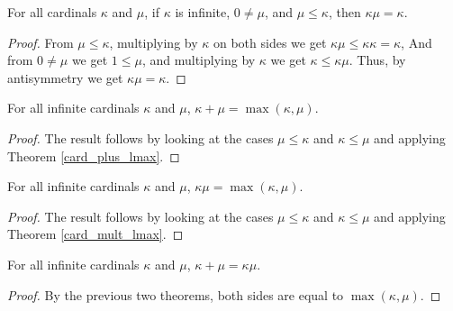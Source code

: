 \documentclass[../../math.tex]{subfiles}
\begin{document}
\begin{theorem} \label{card_mult_lmax}
    For all cardinals $\kappa$ and $\mu$, if $\kappa$ is infinite, $0 \neq \mu$,
    and $\mu \leq \kappa$, then $\kappa \mu = \kappa$.
\end{theorem}
\begin{proof}
    From $\mu \leq \kappa$, multiplying by $\kappa$ on both sides we get $\kappa
    \mu \leq \kappa \kappa = \kappa$,  And from $0 \neq \mu$ we get $1 \leq
    \mu$, and multiplying by $\kappa$ we get $\kappa \leq \kappa \mu$.  Thus, by
    antisymmetry we get $\kappa \mu = \kappa$.
\end{proof}

\begin{theorem} \label{card_plus_max}
    For all infinite cardinals $\kappa$ and $\mu$, $\kappa + \mu = \max(\kappa,
    \mu)$.
\end{theorem}
\begin{proof}
    The result follows by looking at the cases $\mu \leq \kappa$ and $\kappa
    \leq \mu$ and applying Theorem \ref{card_plus_lmax}.
\end{proof}

\begin{theorem} \label{card_mult_max}
    For all infinite cardinals $\kappa$ and $\mu$, $\kappa \mu = \max(\kappa,
    \mu)$.
\end{theorem}
\begin{proof}
    The result follows by looking at the cases $\mu \leq \kappa$ and $\kappa
    \leq \mu$ and applying Theorem \ref{card_mult_lmax}.
\end{proof}

\begin{theorem} \label{card_inf_plus_mult}
    For all infinite cardinals $\kappa$ and $\mu$, $\kappa + \mu = \kappa\mu$.
\end{theorem}
\begin{proof}
    By the previous two theorems, both sides are equal to $\max(\kappa, \mu)$.
\end{proof}
\end{document}
